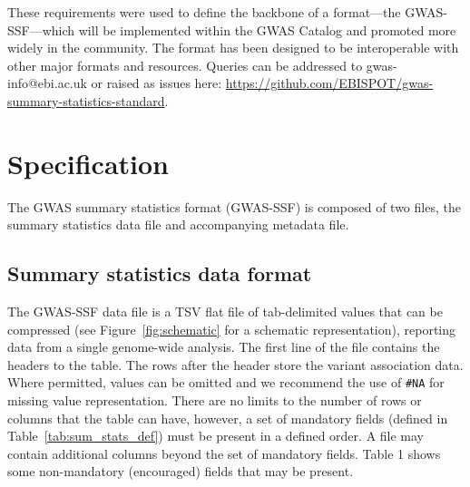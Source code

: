 \documentclass[11pt]{article}
\begin{document}
These requirements were used to define the backbone of a format---the GWAS-SSF---which will be implemented within the GWAS Catalog and promoted more widely in the community. The format has been designed to be interoperable with other major formats and resources. Queries can be addressed to gwas-info@ebi.ac.uk or raised as issues here: \url{https://github.com/EBISPOT/gwas-summary-statistics-standard}.

\section{Specification}
The GWAS summary statistics format (GWAS-SSF) is composed of two files, the summary statistics data file and accompanying metadata file.

\subsection{Summary statistics data format}
The GWAS-SSF data file is a TSV flat file of tab-delimited values that can be compressed (see Figure~\ref{fig:schematic} for a schematic representation), reporting data from a single genome-wide analysis. The first line of the file contains the headers to the table. The rows after the header store the variant association data. Where permitted, values can be omitted and we recommend the use of \texttt{\#NA} for missing value representation. There are no limits to the number of rows or columns that the table can have, however, a set of mandatory fields (defined in Table~\ref{tab:sum_stats_def}) must be present in a defined order. A file may contain additional columns beyond the set of mandatory fields. Table 1 shows some non-mandatory (encouraged) fields that may be present.
\end{document}

